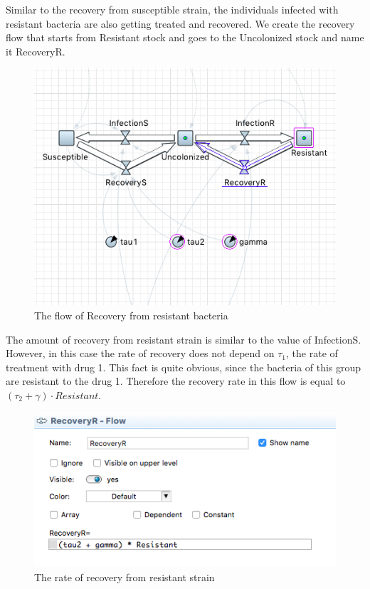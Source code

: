 Similar to the recovery from susceptible strain, the individuals infected with resistant bacteria are also getting treated and recovered. We create the recovery flow that starts from Resistant stock and goes to the Uncolonized stock and name it RecoveryR.

\begin{figure}[H]
  \centering
  \includegraphics[height=0.5\textwidth]{img/screens/recovery/recovery8}
  \caption{The flow of Recovery from resistant bacteria}
\end{figure}

The amount of recovery from resistant strain is similar to the value of InfectionS. However, in this case the rate of recovery does not depend on $\tau_1$, the rate of treatment with drug 1. This fact is quite obvious, since the bacteria of this group are resistant to the drug 1. Therefore the recovery rate in this flow is equal to $(\tau_2 + \gamma) \cdot Resistant$.

\begin{figure}[H]
  \centering
  \includegraphics[height=0.3\textwidth]{img/screens/recovery/recovery10}
  \caption{The rate of recovery from resistant strain}
\end{figure}

